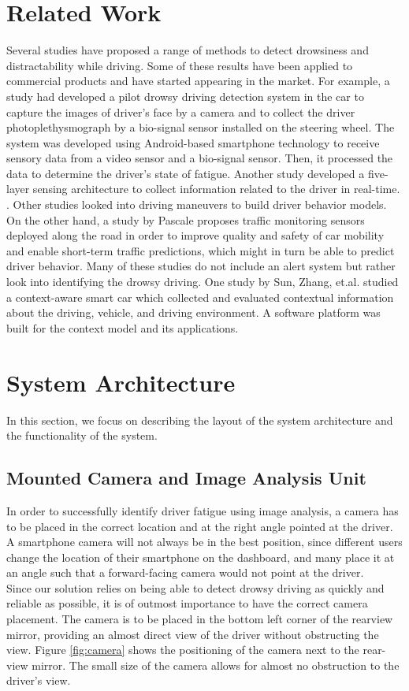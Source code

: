 \documentclass[twocolumn]{article}
\begin{document}
\section{Related Work}
Several studies have proposed a range of methods to detect drowsiness and distractability while driving. Some of these results have been applied to commercial products and have started appearing in the market. For example, a study \cite{fusion} had developed a pilot drowsy driving detection system in the car to capture the images of driver's face by a camera and to collect the driver photoplethysmograph by a bio-signal sensor installed on the steering wheel. The system was developed using Android-based smartphone technology to receive sensory data from a video sensor and a bio-signal sensor. Then, it processed the data to determine the driver's state of fatigue. Another study developed a five-layer sensing architecture to collect information related to the driver in real-time. \cite{sultan}. Other studies \cite{driving_manuever} \cite{sleep_depravation} looked into driving maneuvers to build driver behavior models. On the other hand, a study by Pascale \cite{pascale} proposes traffic monitoring sensors deployed along the road in order to improve quality and safety of car mobility and enable short-term traffic predictions, which might in turn be able to predict driver behavior. Many of these studies do not include an alert system but rather look into identifying the drowsy driving. One study by Sun, Zhang, et.al. \cite{smartcar} studied a context-aware smart car which collected and evaluated contextual information about the driving, vehicle, and driving environment. A software platform was built for the context model and its applications. 

\section{System Architecture}
In this section, we focus on describing the layout of the system architecture and the functionality of the system. 
\subsection{Mounted Camera and Image Analysis Unit}
In order to successfully identify driver fatigue using image analysis, a camera has to be placed in the correct location and at the right angle pointed at the driver. A smartphone camera will not always be in the best position, since different users change the location of their smartphone on the dashboard, and many place it at an angle such that a forward-facing camera would not point at the driver. \\
Since our solution relies on being able to detect drowsy driving as quickly and reliable as possible, it is of outmost importance to have the correct camera placement. The camera is to be placed in the bottom left corner of the rearview mirror, providing an almost direct view of the driver without obstructing the view. Figure \ref{fig:camera} shows the positioning of the camera next to the rear-view mirror. The small size of the camera allows for almost no obstruction to the driver's view. 
\end{document}

